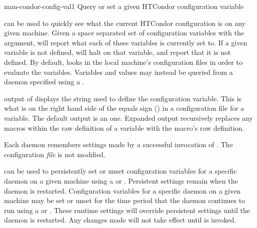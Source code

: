\begin{ManPage}{}{man-condor-config-val}{1}
{Query or set a given HTCondor configuration variable}

\Synopsis {}




\Description

 can be used to quickly see what the current
HTCondor configuration is on any given machine.  
Given a space separated set of
configuration variables with the  argument,
 will report what each of these
variables is currently set to.  If a given variable is not defined,
 will halt on that variable, and report that it is
not defined.  By default,  looks in the local
machine's configuration files in order to evaluate the variables.
Variables and values may instead be queried from a daemon specified
using a .

 output of  displays the string used to
define the configuration variable.
This is what is on the right hand side of the equals sign (\Expr{=})
in a configuration file for a variable.
The default output is an  one.
Expanded output recursively replaces any macros within the raw definition
of a variable with the macro's raw definition.

Each daemon remembers settings made by a successful invocation
of .  
The configuration \emph{file} is not modified.  

 can be used to persistently set or unset 
configuration variables for a specific daemon on a given machine
using a  or  .
Persistent settings remain when the daemon is restarted.  
Configuration variables for a specific daemon on a given machine
may be set or unset for the time period that the daemon continues to run
using a  or  .
These runtime settings will override persistent settings until the daemon is restarted.
Any changes made will not take effect until  is invoked.


\end{ManPage}
